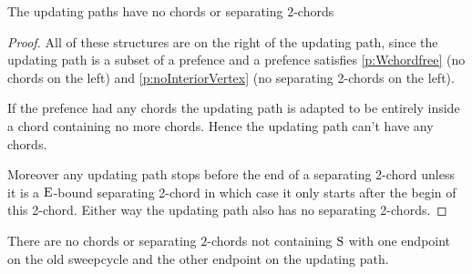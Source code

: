    \begin{lemma}
      The updating paths have no chords or separating $2$-chords
      \label{lm:sweep:augNoIregularity}
    \end{lemma}
    \begin{proof}
        All of these structures are on the right of the updating path, since the updating path is a subset of a prefence and a  prefence satisfies \ref{p:Wchordfree} (no chords on the left) and \ref{p:noInteriorVertex} (no separating 2-chords on the left).

        If the prefence had any chords the updating path is adapted to be entirely inside a chord containing no more chords. Hence the updating path can't have any chords.

        Moreover any updating path stops before the end of a separating 2-chord unless it is a $\mathrm{E}$-bound separating 2-chord in which case it only starts after the begin of this 2-chord. Either way the updating path also has no separating 2-chords.
    \end{proof}

    \begin{lemma}
      \label{lm:sweep:noConnectingIregularity}
      There are no chords or separating $2$-chords not containing $\mathrm{S}$ with one endpoint on the old sweepcycle and the other endpoint on the updating path.
    \end{lemma}

